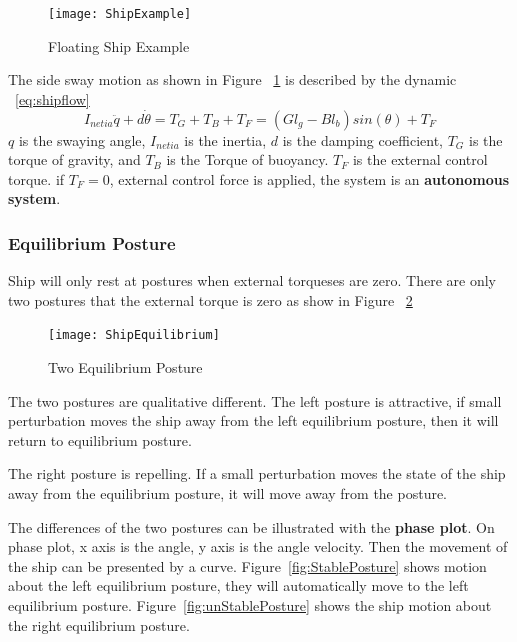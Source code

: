 \begin{figure}[!htbp]
  \begin{center}
    \texttt{[image: ShipExample]}
    \caption{Floating Ship Example}
    \label{fig:ShipFloating}
  \end{center}
\end{figure}



The side sway motion as shown in Figure ~\ref{fig:ShipFloating} is described by the dynamic ~\ref{eq:shipflow}
\begin{equation}
I_{netia}\ddot{q}+d\dot{\theta}=T_{G}+T_{B}+T_{F}=(Gl_{g}-Bl_{b})sin(\theta)+T_{F}
\label{eq:shipflow}
\end{equation}
$q$ is the swaying angle,
$I_{netia}$ is the inertia,  
$d$ is the damping coefficient,
$T_{G}$ is the torque of gravity, and $T_{B}$ is the Torque of buoyancy.
$T_{F}$ is the external control torque.
if $T_{F}=0$, external control force is applied, the system is an \textbf{autonomous system}.





\subsubsection*{Equilibrium Posture}
Ship will only rest at postures when external torqueses are zero.
There are only two postures that the external torque is zero as show in Figure ~\ref{fig:ShipEqulibrium}
\begin{figure}[!htbp]
  \begin{center}
    \leavevmode
      \texttt{[image: ShipEquilibrium]}
    \caption{Two Equilibrium Posture}
    \label{fig:ShipEqulibrium}
  \end{center}
\end{figure}



The two postures are qualitative different.
The left posture is attractive, if small perturbation moves the ship away from the left equilibrium posture, then it will return to equilibrium posture.

The right posture is repelling.
If a small perturbation moves the state of the ship away from the equilibrium posture, it will move away from the posture.

The differences of the two postures can be illustrated with the \textbf{phase plot}.
On phase plot, x axis is the angle, y axis is the angle velocity. 
Then the movement of the ship can be presented by a curve.
Figure~\ref{fig:StablePosture}  shows motion about the left equilibrium posture, they will automatically move to the left equilibrium posture.
Figure~\ref{fig:unStablePosture} shows the ship motion about the right equilibrium posture.
 
